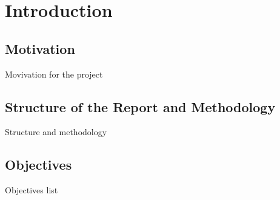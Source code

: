 
\chapter{Introduction}
\label{ch:intro}

\section{Motivation}
\label{ch:intro:motiv}
Movivation for the project

\section{Structure of the Report and Methodology}
\label{ch:intro:method}

Structure and methodology

\section{Objectives}
\label{ch:intro:object}

Objectives list
